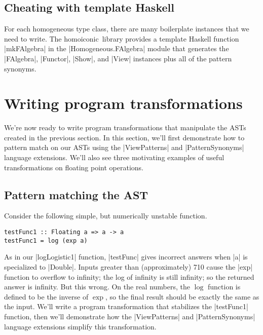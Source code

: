 \documentclass[preprint]{sigplanconf}
\theoremstyle{definition}
\newcommand{\homoiconic}{{\ttfamily homoiconic}~}
\begin{document}
\subsection{Cheating with template Haskell}

For each homogeneous type class,
there are many boilerplate instances that we need to write.
The \homoiconic library provides a template Haskell function |mkFAlgebra| in the |Homogeneous.FAlgebra| module that generates the |FAlgebra|, |Functor|, |Show|, and |View| instances plus all of the pattern synonyms.


\section{Writing program transformations}
\label{sec:stabilize}

We're now ready to write program transformations that manipulate the ASTs created in the previous section.
In this section, we'll first demonstrate how to pattern match on our ASTs using the |ViewPatterns| and |PatternSynonyms| language extensions.
We'll also see three motivating examples of useful transformations on floating point operations.


\subsection{Pattern matching the AST}

Consider the following simple,
but numerically unstable function.
\begin{lstlisting}
testFunc1 :: Floating a => a -> a
testFunc1 = log (exp a)
\end{lstlisting}
As in our |logLogistic1| function,
|testFunc| gives incorrect answers when |a| is specialized to |Double|.
Inputs greater than (approximately) 710 cause the |exp| function to overflow to infinity;
the log of infinity is still infinity;
so the returned answer is infinity.
But this wrong.
On the real numbers, the $\log$ function is defined to be the inverse of $\exp$,
so the final result should be exactly the same as the input.
We'll write a program transformation that stabilizes the |testFunc1| function,
then we'll demonstrate how the |ViewPatterns| and |PatternSynonyms| language extensions simplify this transformation.
\label{sec:viewpatterns}
\end{document}
